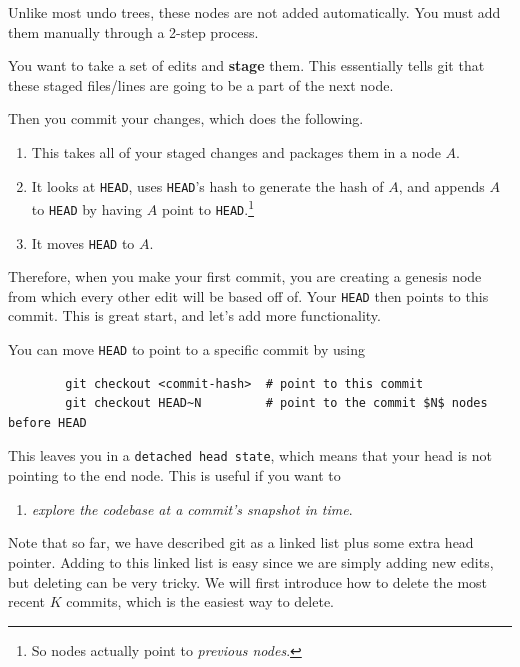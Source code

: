 \documentclass{article}
\begin{document}
    Unlike most undo trees, these nodes are not added automatically. You must add them manually through a 2-step process. 

    \begin{definition}[Stage]
      You want to take a set of edits and \textbf{stage} them. This essentially tells git that these staged files/lines are going to be a part of the next node. 
    \end{definition}

    \begin{definition}[Commit]
      Then you commit your changes, which does the following. 
      \begin{enumerate}
        \item This takes all of your staged changes and packages them in a node $A$. 
        \item It looks at \texttt{HEAD}, uses \texttt{HEAD}'s hash to generate the hash of $A$, and appends $A$ to \texttt{HEAD} by having $A$ point to \texttt{HEAD}.\footnote{So nodes actually point to \textit{previous nodes}.}
        \item It moves \texttt{HEAD} to $A$. 
      \end{enumerate}
    \end{definition} 

    Therefore, when you make your first commit, you are creating a genesis node from which every other edit will be based off of. Your \texttt{HEAD} then points to this commit. This is great start, and let's add more functionality. 

    \begin{definition}
      You can move \texttt{HEAD} to point to a specific commit by using 
      \begin{lstlisting}
        git checkout <commit-hash>  # point to this commit  
        git checkout HEAD~N         # point to the commit $N$ nodes before HEAD
      \end{lstlisting} 
      This leaves you in a \texttt{detached head state}, which means that your head is not pointing to the end node. This is useful if you want to 
      \begin{enumerate}
        \item \textit{explore the codebase at a commit's snapshot in time}. 
      \end{enumerate}
    \end{definition} 

    Note that so far, we have described git as a linked list plus some extra head pointer. Adding to this linked list is easy since we are simply adding new edits, but deleting can be very tricky. We will first introduce how to delete the most recent $K$ commits, which is the easiest way to delete. 
\end{document}
